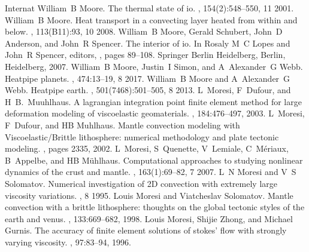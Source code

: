 \documentclass[letterpaper,10pt,english]{jupyterBook}
\begin{document}
\begin{sphinxthebibliography}{Internat}
\sphinxAtStartPar
William B Moore. The thermal state of io. , 154(2):548–550, 11 2001.
\sphinxAtStartPar
William B Moore. Heat transport in a convecting layer heated from within and below. , 113(B11):93, 10 2008.
\sphinxAtStartPar
William B Moore, Gerald Schubert, John D Anderson, and John R Spencer. The interior of io. In Rosaly M C Lopes and John R Spencer, editors, , pages 89–108. Springer Berlin Heidelberg, Berlin, Heidelberg, 2007.
\sphinxAtStartPar
William B Moore, Justin I Simon, and A Alexander G Webb. Heat\sphinxhyphen{}pipe planets. , 474:13–19, 8 2017.
\sphinxAtStartPar
William B Moore and A Alexander G Webb. Heat\sphinxhyphen{}pipe earth. , 501(7468):501–505, 8 2013.
\sphinxAtStartPar
L Moresi, F Dufour, and H \sphinxhyphen{}B. Muuhlhaus. A lagrangian integration point finite element method for large deformation modeling of viscoelastic geomaterials. , 184:476–497, 2003.
\sphinxAtStartPar
L Moresi, F Dufour, and H\sphinxhyphen{}B Muhlhaus. Mantle convection modeling with Viscoelastic/Brittle lithosphere: numerical methodology and plate tectonic modeling. , pages 2335, 2002.
\sphinxAtStartPar
L Moresi, S Quenette, V Lemiale, C Mériaux, B Appelbe, and H\sphinxhyphen{}B Mühlhaus. Computational approaches to studying non\sphinxhyphen{}linear dynamics of the crust and mantle. , 163(1):69–82, 7 2007.
\sphinxAtStartPar
L N Moresi and V S Solomatov. Numerical investigation of 2D convection with extremely large viscosity variations. , 8 1995.
\sphinxAtStartPar
Louis Moresi and Viatcheslav Solomatov. Mantle convection with a brittle lithosphere: thoughts on the global tectonic styles of the earth and venus. , 133:669–682, 1998.
\sphinxAtStartPar
Louis Moresi, Shijie Zhong, and Michael Gurnis. The accuracy of finite element solutions of stokes' flow with strongly varying viscosity. , 97:83–94, 1996.

\end{sphinxthebibliography}
\end{document}
